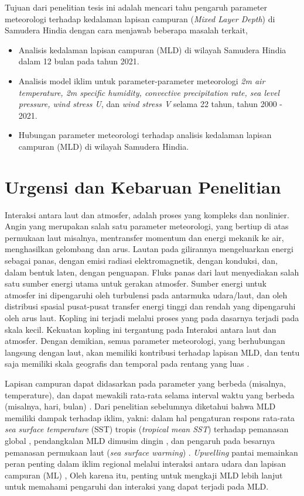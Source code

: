 \begin{spacing}{1.5}
	Tujuan dari penelitian tesis ini adalah mencari tahu pengaruh parameter meteorologi terhadap kedalaman lapisan campuran (\textit{Mixed Layer Depth}) di Samudera Hindia dengan cara menjawab beberapa masalah terkait,
	
	\begin{itemize}
		\item Analisis kedalaman lapisan campuran (MLD) di wilayah Samudera Hindia dalam 12 bulan pada tahun 2021.
		\item Analisis model iklim untuk parameter-parameter meteorologi \textit{2m air temperature, 2m specific humidity, convective precipitation rate, sea level pressure, wind stress U}, dan \textit{wind stress V} selama 22 tahun, tahun 2000 - 2021.
		\item Hubungan parameter meteorologi terhadap analisis kedalaman lapisan campuran (MLD) di wilayah Samudera Hindia.
	\end{itemize}
	
	\section[Urgensi dan Kebaruan Penelitian]{Urgensi dan Kebaruan Penelitian}

	Interaksi antara laut dan atmosfer, adalah proses yang kompleks dan nonlinier. Angin yang merupakan salah satu parameter meteorologi, yang bertiup di atas permukaan laut misalnya, mentransfer momentum dan energi mekanik ke air, menghasilkan gelombang dan arus. Lautan pada gilirannya mengeluarkan energi sebagai panas, dengan emisi radiasi elektromagnetik, dengan konduksi, dan, dalam bentuk laten, dengan penguapan. Fluks panas dari laut menyediakan salah satu sumber energi utama untuk gerakan atmosfer. Sumber energi untuk atmosfer ini dipengaruhi oleh turbulensi pada antarmuka udara/laut, dan oleh distribusi spasial pusat-pusat transfer energi tinggi dan rendah yang dipengaruhi oleh arus laut. Kopling ini terjadi melalui proses yang pada dasarnya terjadi pada skala kecil. Kekuatan kopling ini tergantung pada Interaksi antara laut dan atmosfer. Dengan demikian, semua parameter meteorologi, yang berhubungan langsung dengan laut, akan memiliki kontribusi terhadap lapisan MLD, dan tentu saja memiliki skala geografis dan temporal pada rentang yang luas .
	
	Lapisan campuran dapat didasarkan pada parameter yang berbeda (misalnya, temperature), dan dapat mewakili rata-rata selama interval waktu yang berbeda (misalnya, hari, bulan) . Dari penelitian sebelumnya diketahui bahwa MLD memiliki dampak terhadap iklim, yakni: dalam hal pengaturan respons rata-rata \textit{sea surface temperature} (SST) tropis (\textit{tropical mean SST}) terhadap pemanasan global , pendangkalan MLD dimusim dingin , dan pengaruh pada besarnya pemanasan permukaan laut (\textit{sea surface warming}) . \textit{Upwelling} pantai memainkan peran penting dalam iklim regional melalui interaksi antara udara dan lapisan campuran (ML) , Oleh karena itu, penting untuk mengkaji MLD lebih lanjut untuk memahami pengaruhi dan interaksi yang dapat terjadi pada MLD.
	

\end{spacing}
